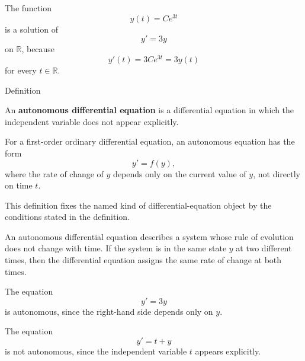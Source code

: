 \begin{example*}
The function
\[
y(t)=Ce^{3t}
\]
is a solution of
\[
y'=3y
\]
on $\mathbb{R}$, because
\[
y'(t)=3Ce^{3t}=3y(t)
\]
for every $t\in\mathbb{R}$.
\end{example*}




\begin{definitionbox}{Definition}
\begin{definition}
\label{def:ordinary-differential-equations-terminology-autonomous-differential-equation}
An \textbf{autonomous differential equation} is a differential equation in which the independent variable does not appear explicitly.

For a first-order ordinary differential equation, an autonomous equation has the form
\[
y'=f(y),
\]
where the rate of change of $y$ depends only on the current value of $y$, not directly on time $t$.
\end{definition}
\end{definitionbox}

\begin{remark*}
This definition fixes the named kind of differential-equation object by the
conditions stated in the definition.
\end{remark*}

\NoLocalDependencies

\begin{remark*}[Interpretation]
An autonomous differential equation describes a system whose rule of evolution does not change with time. If the system is in the same state $y$ at two different times, then the differential equation assigns the same rate of change at both times.
\end{remark*}

\begin{example*}
The equation
\[
y'=3y
\]
is autonomous, since the right-hand side depends only on $y$.

The equation
\[
y'=t+y
\]
is not autonomous, since the independent variable $t$ appears explicitly.
\end{example*}



